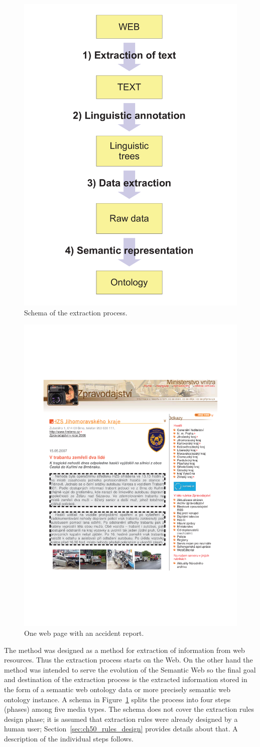 \begin{figure}
	\centering
		\includegraphics[width=0.2\hsize]{ap_schema}
	\caption{Schema of the extraction process.}
	\label{fig:ch50_ap_schema}
\end{figure}


\begin{figure}
	\centering
		\includegraphics[width=0.5\hsize]{article}
	\caption{One web page with an accident report.}
	\label{fig:ch50_article}
\end{figure}


The method was designed as a method for extraction of information from web resources. Thus the extraction process starts on the Web. On the other hand the method was intended to serve the evolution of the Semantic Web so the final goal and destination of the extraction process is the extracted information stored in the form of a semantic web ontology data or more precisely semantic web ontology instance. A schema in Figure~\ref{fig:ch50_ap_schema} splits the process into four steps (phases) among five media types. The schema does not cover the extraction rules design phase; it is assumed that extraction rules were already designed by a human user; Section~\ref{sec:ch50_rules_design} provides details about that. A description of the individual steps follows. 



